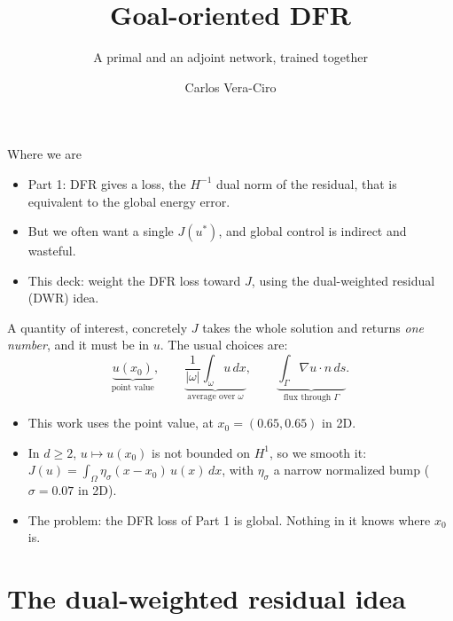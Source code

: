\documentclass[11pt,aspectratio=169]{beamer}
\title{Goal-oriented DFR}
\subtitle{A primal and an adjoint network, trained together}
\author{Carlos Vera-Ciro}
\institute{Goal-Oriented DFR series \textbar\ Part 2}
\date{}
\begin{document}
\begin{frame}
  \titlepage
\end{frame}

\begin{frame}{Where we are}
  \begin{itemize}\itemsep0.6em
    \item Part 1: DFR gives a loss, the $H^{-1}$ dual norm of the residual, that
          is equivalent to the global energy error.
    \item But we often want a single  $J(u^*)$,
          and global control is indirect and wasteful.
    \item This deck: weight the DFR loss toward $J$, using the dual-weighted
          residual (DWR) idea.
  \end{itemize}
\end{frame}

\begin{frame}{A quantity of interest, concretely}
  $J$ takes the whole solution and returns \emph{one number}, and it must be
   in $u$. The usual choices are:
  \[
    \underbrace{u(x_0)}_{\text{point value}}, \qquad
    \underbrace{\frac{1}{|\omega|}\int_\omega u \, dx}_{\text{average over } \omega}, \qquad
    \underbrace{\int_\Gamma \nabla u \cdot n \, ds}_{\text{flux through } \Gamma} .
  \]
  \begin{itemize}\itemsep0.4em
    \item This work uses the point value, at $x_0 = (0.65, 0.65)$ in 2D.
    \item In $d \ge 2$, $u \mapsto u(x_0)$ is not bounded on $H^1$, so we smooth
          it: $J(u) = \int_\Omega \eta_\sigma(x - x_0)\,u(x)\,dx$, with
          $\eta_\sigma$ a narrow normalized bump ($\sigma = 0.07$ in 2D).
    \item \alert{The problem:} the DFR loss of Part 1 is global. Nothing in it
          knows where $x_0$ is.
  \end{itemize}
\end{frame}

\section{The dual-weighted residual idea}
\end{document}
